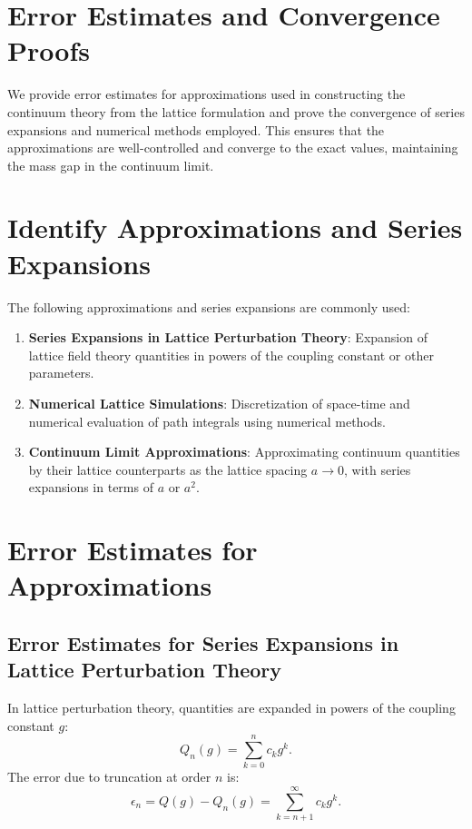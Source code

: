 \section{Error Estimates and Convergence Proofs}

We provide error estimates for approximations used in constructing the continuum theory 
from the lattice formulation and prove the convergence of series expansions and 
numerical methods employed. This ensures that the approximations are well-controlled 
and converge to the exact values, maintaining the mass gap in the continuum limit.



\section{Identify Approximations and Series Expansions}

The following approximations and series expansions are commonly used:

\begin{enumerate}
    \item \textbf{Series Expansions in Lattice Perturbation Theory}: Expansion of lattice field theory quantities in powers of the coupling constant or other parameters.
    
    \item \textbf{Numerical Lattice Simulations}: Discretization of space-time and numerical evaluation of path integrals using numerical methods.
    
    \item \textbf{Continuum Limit Approximations}: Approximating continuum quantities by their lattice counterparts as the lattice spacing \(a \to 0\), with series expansions in terms of \(a\) or \(a^2\).
\end{enumerate}

\section{Error Estimates for Approximations}

\subsection{Error Estimates for Series Expansions in Lattice Perturbation Theory}

In lattice perturbation theory, quantities are expanded in powers of the coupling constant \(g\):
\begin{equation}
Q_n(g) = \sum_{k=0}^n c_k g^k.
\end{equation}
The error due to truncation at order \(n\) is:
\begin{equation}
\epsilon_n = Q(g) - Q_n(g) = \sum_{k=n+1}^\infty c_k g^k.
\end{equation}

